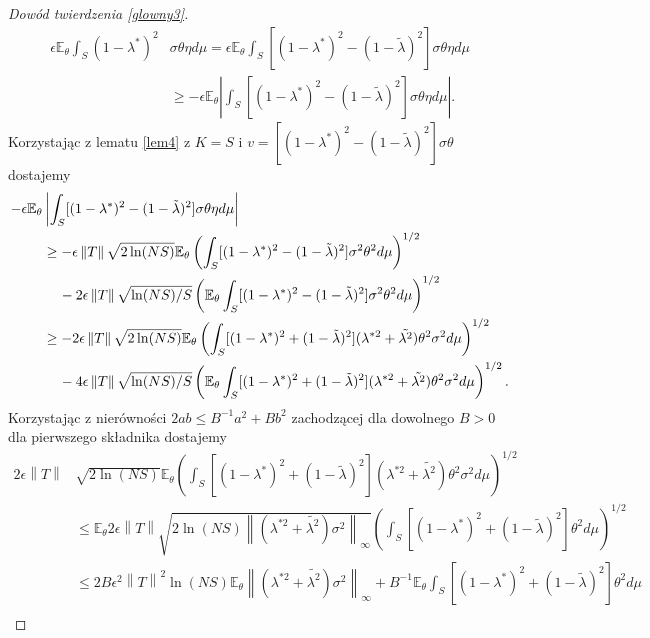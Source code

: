 \documentclass[man,mfiu]{mgrwms}
\newcommand{\norm}[1]{\left\lVert#1\right\rVert}
\begin{document}
\begin{proof}[Dowód twierdzenia \ref{glowny3}]
\begin{displaymath}
\begin{split}
\epsilon\mathbb{E}_{\theta}\int_S(1-\lambda^*)^2&\sigma \theta \eta d\mu=
\epsilon\mathbb{E}_{\theta}\int_S[(1-\lambda^*)^2-(1-\tilde{\lambda})^2]\sigma \theta \eta d\mu\\
&\geq -\epsilon\mathbb{E}_{\theta}\left|\int_S[(1-\lambda^*)^2-(1-\tilde{\lambda})^2]\sigma \theta \eta d\mu\right|.
\end{split}
\end{displaymath}
Korzystając z lematu \ref{lem4} z $K=S$ i $v=[(1-\lambda^*)^2-(1-\tilde{\lambda})^2]\sigma \theta $ dostajemy
\begin{displaymath}
\begin{split}
-\epsilon\mathbb{E}_{\theta}&\left|\int_S[(1-\lambda^*)^2-(1-\tilde{\lambda})^2]\sigma \theta \eta d\mu\right|\\
&\geq -\epsilon\norm{T}\sqrt{2\ln (NS)}\mathbb{E}_{\theta}\left(\int_S[(1-\lambda^*)^2-(1-\tilde{\lambda})^2]\sigma^2\theta ^2 d\mu\right)^{1/2}\\
&\hspace{4mm}-2\epsilon\norm{T}\sqrt{\ln (NS)/S}\left(\mathbb{E}_{\theta}\int_S[(1-\lambda^*)^2-(1-\tilde{\lambda})^2]\sigma^2\theta ^2 d\mu\right)^{1/2}\\
&\geq -2\epsilon\norm{T}\sqrt{2\ln (NS)}\mathbb{E}_{\theta}\left(\int_S[(1-\lambda^*)^2+(1-\tilde{\lambda})^2](\lambda^{*2}+\tilde{\lambda^2})\theta ^2\sigma^2d\mu\right)^{1/2}\\
&\hspace{4mm}-4\epsilon\norm{T}\sqrt{\ln (NS)/S}\left(\mathbb{E}_{\theta}\int_S[(1-\lambda^*)^2+(1-\tilde{\lambda})^2](\lambda^{*2}+\tilde{\lambda^2})\theta ^2\sigma^2 d\mu\right)^{1/2}.
\end{split}
\end{displaymath}
Korzystając  z nierówności $2ab\leq B^{-1}a^2+Bb^2$ zachodzącej dla dowolnego $B>0$ dla pierwszego składnika dostajemy
\begin{displaymath}
\begin{split}
2\epsilon\norm{T}&\sqrt{2\ln (NS)}\mathbb{E}_{\theta}\left(\int_S[(1-\lambda^*)^2+(1-\tilde{\lambda})^2](\lambda^{*2}+\tilde{\lambda^2})\theta ^2\sigma^2d\mu\right)^{1/2}\\
&\leq \mathbb{E}_{\theta}2\epsilon\norm{T}\sqrt{2\ln (NS)\norm{(\lambda^{*2}+\tilde{\lambda^2})\sigma^2}_{\infty}}\left(\int_S[(1-\lambda^*)^2+(1-\tilde{\lambda})^2]\theta ^2d\mu\right)^{1/2}\\
&\leq 2B\epsilon^2\norm{T}^2 \ln (NS)\mathbb{E}_{\theta}\norm{(\lambda^{*2}+\tilde{\lambda^2})\sigma^2}_{\infty}+B^{-1}\mathbb{E}_{\theta}\int_S[(1-\lambda^*)^2+(1-\tilde{\lambda})^2]\theta ^2d\mu\\

\end{split}
\end{displaymath}
\end{proof}
\end{document}
